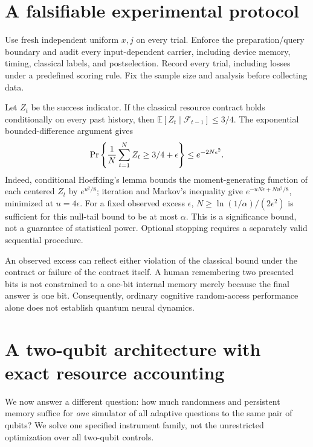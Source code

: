 \documentclass[11pt,a4paper]{article}
\theoremstyle{definition}
\newcommand{\E}{\mathbb E}
\begin{document}
\section{A falsifiable experimental protocol}
Use fresh independent uniform $x,j$ on every trial. Enforce the preparation/query boundary and audit every input-dependent carrier, including device memory, timing, classical labels, and postselection. Record every trial, including losses under a predefined scoring rule. Fix the sample size and analysis before collecting data.

Let $Z_t$ be the success indicator. If the classical resource contract holds conditionally on every past history, then $\E[Z_t\mid\mathcal F_{t-1}]\le3/4$. The exponential bounded-difference argument gives
\[
 \Pr\left\{{1\over N}\sum_{t=1}^NZ_t\ge3/4+\epsilon\right\}
 \le e^{-2N\epsilon^2}.
\]
Indeed, conditional Hoeffding's lemma bounds the moment-generating function of each centered $Z_t$ by $e^{u^2/8}$; iteration and Markov's inequality give $e^{-uN\epsilon+Nu^2/8}$, minimized at $u=4\epsilon$. For a fixed observed excess $\epsilon$, $N\ge\ln(1/\alpha)/(2\epsilon^2)$ is sufficient for this null-tail bound to be at most $\alpha$. This is a significance bound, not a guarantee of statistical power. Optional stopping requires a separately valid sequential procedure.

An observed excess can reflect either violation of the classical bound under the contract or failure of the contract itself. A human remembering two presented bits is not constrained to a one-bit internal memory merely because the final answer is one bit. Consequently, ordinary cognitive random-access performance alone does not establish quantum neural dynamics.

\section{A two-qubit architecture with exact resource accounting}
We now answer a different question: how much randomness and persistent memory suffice for \emph{one} simulator of all adaptive questions to the same pair of qubits? We solve one specified instrument family, not the unrestricted optimization over all two-qubit controls.
\end{document}
